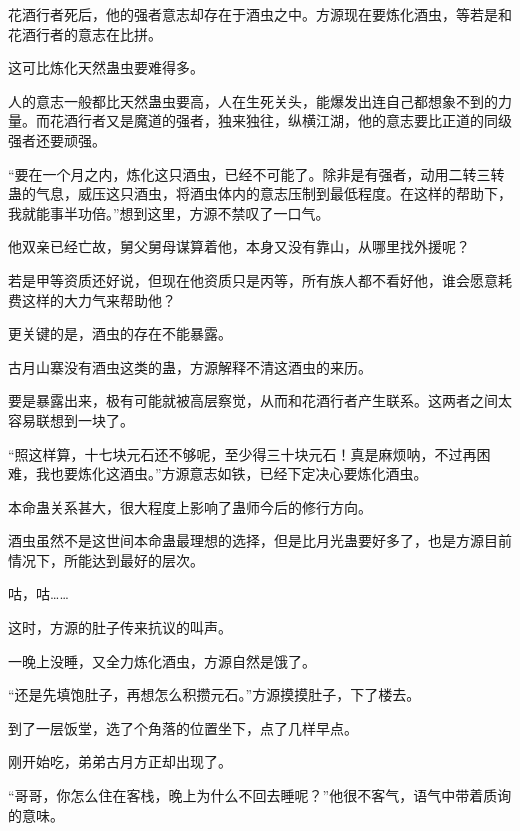 \begin{this_body}
花酒行者死后，他的强者意志却存在于酒虫之中。方源现在要炼化酒虫，等若是和花酒行者的意志在比拼。

这可比炼化天然蛊虫要难得多。

人的意志一般都比天然蛊虫要高，人在生死关头，能爆发出连自己都想象不到的力量。而花酒行者又是魔道的强者，独来独往，纵横江湖，他的意志要比正道的同级强者还要顽强。

“要在一个月之内，炼化这只酒虫，已经不可能了。除非是有强者，动用二转三转蛊的气息，威压这只酒虫，将酒虫体内的意志压制到最低程度。在这样的帮助下，我就能事半功倍。”想到这里，方源不禁叹了一口气。

他双亲已经亡故，舅父舅母谋算着他，本身又没有靠山，从哪里找外援呢？

若是甲等资质还好说，但现在他资质只是丙等，所有族人都不看好他，谁会愿意耗费这样的大力气来帮助他？

更关键的是，酒虫的存在不能暴露。

古月山寨没有酒虫这类的蛊，方源解释不清这酒虫的来历。

要是暴露出来，极有可能就被高层察觉，从而和花酒行者产生联系。这两者之间太容易联想到一块了。

“照这样算，十七块元石还不够呢，至少得三十块元石！真是麻烦呐，不过再困难，我也要炼化这酒虫。”方源意志如铁，已经下定决心要炼化酒虫。

本命蛊关系甚大，很大程度上影响了蛊师今后的修行方向。

酒虫虽然不是这世间本命蛊最理想的选择，但是比月光蛊要好多了，也是方源目前情况下，所能达到最好的层次。

咕，咕……

这时，方源的肚子传来抗议的叫声。

一晚上没睡，又全力炼化酒虫，方源自然是饿了。

“还是先填饱肚子，再想怎么积攒元石。”方源摸摸肚子，下了楼去。

到了一层饭堂，选了个角落的位置坐下，点了几样早点。

刚开始吃，弟弟古月方正却出现了。

“哥哥，你怎么住在客栈，晚上为什么不回去睡呢？”他很不客气，语气中带着质询的意味。

\end{this_body}

